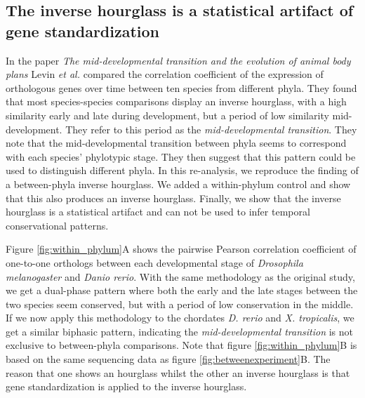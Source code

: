 \subsection{The inverse hourglass is a statistical artifact of gene standardization} \label{subsection:levin}

In the paper \textit{The mid-developmental transition and the evolution of animal body plans}\cite{Levin2016} Levin \textit{et al.} compared the correlation coefficient of the expression of orthologous genes over time between ten species from different phyla. They found that most species-species comparisons display an inverse hourglass, with a high similarity early and late during development, but a period of low similarity mid-development. They refer to this period as the \textit{mid-developmental transition}. They note that the mid-developmental transition between phyla seems to correspond with each species' phylotypic stage. They then suggest that this pattern could be used to distinguish different phyla. In this re-analysis, we reproduce the finding of a between-phyla inverse hourglass. We added a within-phylum control and show that this also produces an inverse hourglass. Finally, we show that the inverse hourglass is a statistical artifact and can not be used to infer temporal conservational patterns.

Figure \ref{fig:within_phylum}A shows the pairwise Pearson correlation coefficient of one-to-one orthologs between each developmental stage of \textit{Drosophila melanogaster} and \textit{Danio rerio}. With the same methodology as the original study, we get a dual-phase pattern where both the early and the late stages between the two species seem conserved, but with a period of low conservation in the middle. If we now apply this methodology to the chordates \textit{D. rerio} and \textit{X. tropicalis}, we get a similar biphasic pattern, indicating the \textit{mid-developmental transition} is not exclusive to between-phyla comparisons. Note that figure \ref{fig:within_phylum}B is based on the same sequencing data as figure \ref{fig:betweenexperiment}B. The reason that one shows an hourglass whilst the other an inverse hourglass is that gene standardization is applied to the inverse hourglass.

